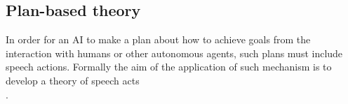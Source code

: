 
\subsection{Plan-based theory}
In order for an AI to make a plan about how to achieve goals from the interaction with humans or other autonomous agents, such plans must include speech actions.  Formally the aim of the application of such mechanism is to develop a theory of speech acts\\
.

